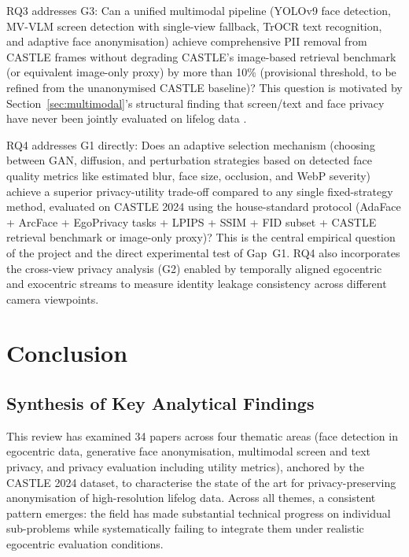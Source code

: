 \documentclass[12pt, onecolumn]{IEEEtran}
\begin{document}
RQ3 addresses G3: Can a unified multimodal pipeline (YOLOv9 face
detection, MV-VLM screen detection with single-view fallback, TrOCR
text recognition, and adaptive face anonymisation) achieve comprehensive
PII removal from CASTLE frames without degrading CASTLE's image-based
retrieval benchmark (or equivalent image-only proxy) by more than 10\%
(provisional threshold, to be refined from the unanonymised CASTLE
baseline)? This question is motivated by Section~\ref{sec:multimodal}'s
structural finding that screen/text and face privacy have never been
jointly evaluated on lifelog data
\cite{liao2020dbnet, baek2019craft, li2023trocr}.

RQ4 addresses G1 directly: Does an adaptive selection mechanism (choosing
between GAN, diffusion, and perturbation strategies based on detected
face quality metrics like estimated blur, face size, occlusion, and WebP severity)
achieve a superior privacy-utility trade-off compared to any single fixed-strategy
method, evaluated on CASTLE 2024 using the house-standard protocol (AdaFace \cite{kim2022adaface} +
ArcFace \cite{deng2019arcface} + EgoPrivacy tasks \cite{li2025egoprivacy} +
LPIPS \cite{zhang2018lpips} + SSIM \cite{wang2004ssim} + FID subset \cite{heusel2017fid} +
CASTLE retrieval benchmark or image-only proxy)? This is the central empirical
question of the project and the direct experimental test of Gap~G1. RQ4 also
incorporates the cross-view privacy analysis (G2) enabled by temporally aligned
egocentric and exocentric streams to measure identity leakage consistency across
different camera viewpoints.




\section{Conclusion}
\label{sec:conclusion}

\subsection{Synthesis of Key Analytical Findings}

This review has examined 34 papers across four thematic areas (face
detection in egocentric data, generative face anonymisation, multimodal
screen and text privacy, and privacy evaluation including utility
metrics), anchored by the CASTLE 2024 dataset, to characterise the state of the art for
privacy-preserving anonymisation of high-resolution lifelog data. Across
all themes, a consistent pattern emerges: the field has made substantial
technical progress on individual sub-problems while systematically
failing to integrate them under realistic egocentric evaluation
conditions.
\end{document}
